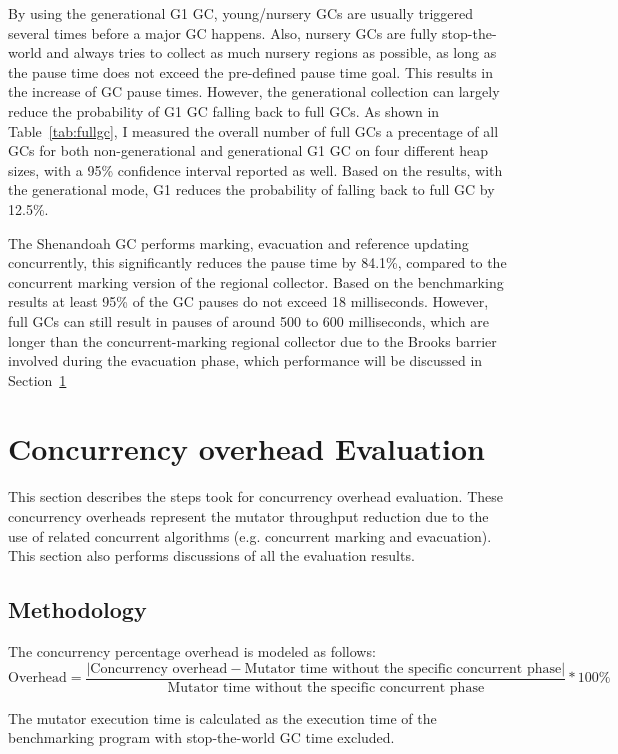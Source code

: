 By using the generational G1 GC, young/nursery GCs are usually triggered several times
before a major GC happens. Also, nursery GCs are fully stop-the-world and always tries
to collect as much nursery regions as possible, as long as the pause time does not exceed
the pre-defined pause time goal. This results in the increase of GC pause times.
However, the generational collection can largely reduce the probability of G1 GC falling
back to full GCs. As shown in Table~\ref{tab:fullgc}, I measured the overall number of full GCs a precentage of all GCs
for both non-generational and generational G1 GC on four different heap sizes,
with a 95\% confidence interval reported as well.
Based on the results, with the generational mode, G1 reduces the
probability of falling back to full GC by 12.5\%.

The Shenandoah GC performs marking, evacuation and reference updating concurrently,
this significantly reduces the pause time by 84.1\%, compared to the concurrent marking version
of the regional collector. Based on the benchmarking results at least 95\% of
the GC pauses do not exceed 18 milliseconds. However, full GCs can still result
in pauses of around 500 to 600 milliseconds, which are longer than the concurrent-marking
regional collector due to the Brooks barrier involved during the evacuation phase, which performance
will be discussed in Section~\ref{sec:barrierlatency}

\section{Concurrency overhead Evaluation} %
\label{sec:barrierlatency}

This section describes the steps took for concurrency overhead evaluation.
These concurrency overheads represent the mutator throughput reduction due to the
use of related concurrent algorithms (e.g. concurrent marking and evacuation).
This section also performs discussions of all the evaluation results.

\subsection{Methodology}

The concurrency percentage overhead is modeled as follows:
$$
\text{Overhead} = \frac{|\text{Concurrency overhead} - \text{Mutator time without the specific concurrent phase}|}{\text{Mutator time without the specific concurrent phase}} * 100\%
$$

The mutator execution time is calculated as the execution time of the benchmarking program with
stop-the-world GC time excluded.

